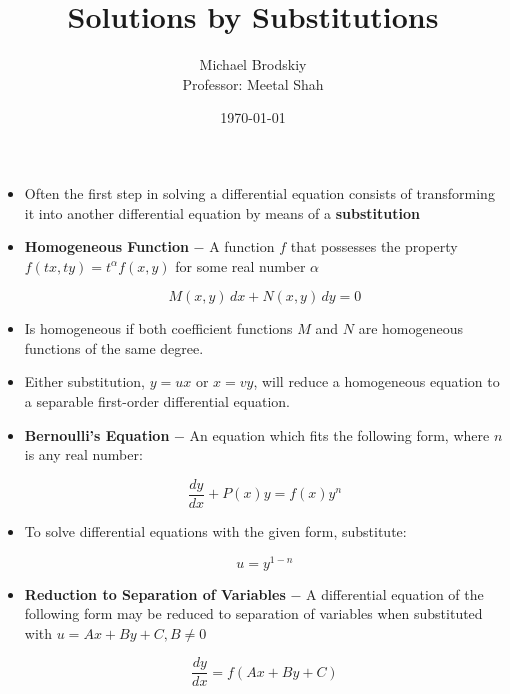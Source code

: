 \documentclass[12pt]{article}
\title{Solutions by Substitutions}
\date{\today}
\author{Michael Brodskiy\\ \small Professor: Meetal Shah}
\begin{document}
\maketitle

\begin{itemize}

  \item Often the first step in solving a differential equation consists of transforming it into another differential equation by means of a \textbf{substitution}

  \item \textbf{Homogeneous Function} $-$ A function $f$ that possesses the property $f(tx,ty)=t^{\alpha}f(x,y)$ for some real number $\alpha$

    $$M(x,y)\,dx+N(x,y)\,dy=0$$

  \item Is homogeneous if both coefficient functions $M$ and $N$ are homogeneous functions of the same degree.

  \item Either substitution, $y=ux$ or $x=vy$, will reduce a homogeneous equation to a separable first-order differential equation.

  \item \textbf{Bernoulli's Equation} $-$ An equation which fits the following form, where $n$ is any real number:

    $$\frac{dy}{dx}+P(x)y=f(x)y^n$$

  \item To solve differential equations with the given form, substitute:

    $$u=y^{1-n}$$

  \item \textbf{Reduction to Separation of Variables} $-$ A differential equation of the following form may be reduced to separation of variables when substituted with $u=Ax+By+C, B\neq0$

    $$\frac{dy}{dx}=f(Ax+By+C)$$

\end{itemize}
\end{document}
